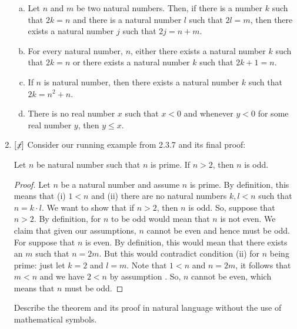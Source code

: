 \begin{enumerate}[{\thesection}.1]
	\begin{enumerate}[(a)]
	
		\item Let $n$ and $m$ be two natural numbers. Then, if there is a number $k$ such that $2k=n$ and there is a natural number $l$ such that $2l=m$, then there exists a natural number $j$ such that $2j=n+m$.
		
		\item For every natural number, $n$, either there exists a natural number $k$ such that $2k=n$ or there exists a natural number $k$ such that $2k+1=n$.
		
		\item If $n$ is natural number, then there exists a natural number $k$ such that $2k=n^2+n$.
		
		\item There is no real number $x$ such that $x<0$ and whenever $y<0$ for some real number $y$, then $y\leq x$. 
					
	\end{enumerate}
	
	\item $[\not\hspace{-.5ex}x]$ Consider our running example from 2.3.7 and its final proof:
	
	\begin{proposition}
				Let $n$ be natural number such that $n$ is prime. If $n>2$, then $n$ is odd.
				\end{proposition}
				
				\begin{proof}
		Let $n$ be a natural number and assume $n$ is prime. By definition, this means that (i) $1<n$ and (ii) there are no natural numbers $k,l<n$ such that $n=k\cdot l$. We want to show that if $n>2$, then $n$ is odd. So, suppose that $n>2$. By definition, for $n$ to be odd would mean that $n$ is not even. We claim that given our assumptions, $n$ cannot be even and hence must be odd. For suppose that $n$ is even. By definition, this would mean that there exists an $m$ such that $n=2m$. But this would contradict condition (ii) for $n$ being prime: just let $k=2$ and $l=m$. Note that $1<n$ and $n=2m$, it follows that $m<n$ and we have $2<n$ by assumption . So, $n$ cannot be even, which means that $n$ must be odd.
		\end{proof}
	
		Describe the theorem and its proof in natural language without the use of mathematical symbols.

\end{enumerate}

